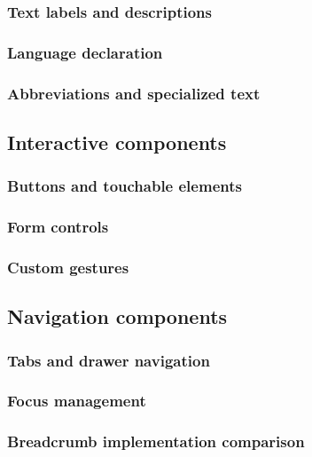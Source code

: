 \subsubsection{Text labels and descriptions}

\subsubsection{Language declaration}

\subsubsection{Abbreviations and specialized text}

\subsection{Interactive components}

\subsubsection{Buttons and touchable elements}

\subsubsection{Form controls}

\subsubsection{Custom gestures}

\subsection{Navigation components}

\subsubsection{Tabs and drawer navigation}

\subsubsection{Focus management}

\subsubsection{Breadcrumb implementation comparison}


